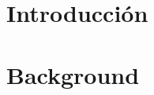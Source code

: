\documentclass[a4paper,11pt]{book}
\theoremstyle{definition} \newtheorem{axiom}{Axioma}
\theoremstyle{theorem} \newtheorem{teorema}{Teorema}
\begin{document}


\makeatother
\newcommand{\Nat}{\mathbb{N}}
\newcommand{\IM}[1]{\underline{#1}}
\newcommand{\cita}{\textcolor{red}{cita}}
\newcommand{\alert}[1]{\footnote{\textcolor{red}{#1}}}
\newcommand{\red}[1]{\textcolor{red}{#1}}

\newcommand{\mycomment}[1]{\textcolor{blue}{#1}\newline}
\theoremstyle{definition} \newtheorem{definition}{Definici'on}


\newcommand{\defaultAlignment}{center}
\newcommand{\defaultWidth}{12.5cm}
\newcommand{\defaultPosition}{h}
\newenvironment{imagen}{
\let\File\empty
\let\Desc\empty
\let\LabelName\empty
\let\Width\textwidth
\let\Alignment\defaultAlignment
\let\Position\defaultPosition
}{
    \begin{figure}[\Position]
    \begin{\Alignment}
    \texttt{[image: \\File]}
    \caption{\Desc}
    \label{\LabelName}
    \end{\Alignment}
    \end{figure}

}

\newcommand{\position}[1]{\def\Position{#1}}
\newcommand{\file}[1]{\def\File{#1}}
\newcommand{\desc}[1]{\def\Desc{#1}}
\newcommand{\labelname}[1]{\def\LabelName{#1}}
\newcommand{\width}[1]{\def\Width{#1}}
\newcommand{\alignment}[1]{\def\Alignment{#1}}



\frontmatter

%

%
%
%
%
%

\setlength{\parskip}{0ex plus 0.5ex minus 0.2ex}
\tableofcontents

\mainmatter
\fancyhead[LO]{\leftmark}


\chapter{Introducci\'on}


\chapter{Background}
\label{cap:background}


\end{document}
